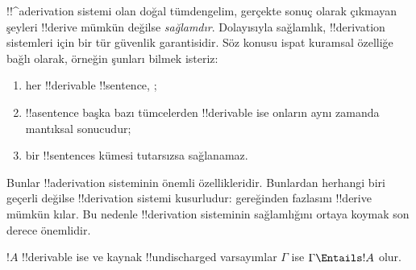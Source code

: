 

      {}
      {}
      

\begin{explain}
!!^a{derivation} sistemi olan doğal tümdengelim, gerçekte sonuç olarak
çıkmayan şeyleri !!{derive} mümkün değilse \emph{sağlamdır}. Dolayısıyla
sağlamlık, !!{derivation} sistemleri için bir tür güvenlik garantisidir. Söz
konusu ispat kuramsal özelliğe bağlı olarak, örneğin şunları bilmek isteriz:
\begin{enumerate}
\item her !!{derivable} !!{sentence}, ;
\item !!a{sentence} başka bazı tümcelerden !!{derivable} ise onların aynı
  zamanda mantıksal sonucudur;
\item bir !!{sentence}s kümesi tutarsızsa sağlanamaz.
\end{enumerate}
Bunlar !!a{derivation} sisteminin önemli özellikleridir. Bunlardan herhangi
biri geçerli değilse !!{derivation} sistemi kusurludur: gereğinden fazlasını
!!{derive} mümkün kılar. Bu nedenle !!{derivation} sisteminin sağlamlığını ortaya
koymak son derece önemlidir.
\end{explain}

\begin{thm}[Sağlamlık]
$!A$ !!{derivable} ise ve kaynak !!{undischarged} varsayımlar $\Gamma$ ise
$\Gamma \Entails !A$ olur.
\end{thm}

